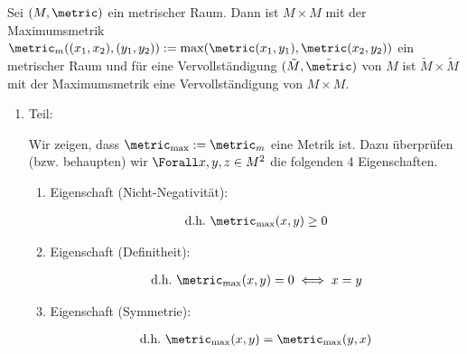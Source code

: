 
\begin{exercise}

Sei $(M, \metric)$ ein metrischer Raum.
Dann ist $M \times M$ mit der Maximumsmetrik $\metric_m((x_1, x_2), (y_1, y_2)) := \max(\metric(x_1, y_1), \metric(x_2, y_2))$ ein metrischer Raum und für eine Vervollständigung $(\tilde M, \tilde \metric)$ von $M$ ist $\tilde M \times \tilde M$ mit der Maximumsmetrik eine Vervollständigung von $M \times M$.

\end{exercise}


\begin{solution}

\phantom{}

\begin{enumerate}[label = \arabic*.]

    \item Teil:
    
    Wir zeigen, dass $\metric_{\max} := \metric_m$ eine Metrik ist.
    Dazu überprüfen (bzw. behaupten) wir $\Forall x, y, z \in M^2$ die folgenden 4 Eigenschaften.
    
    \begin{enumerate}[label = \arabic*.]

        \item Eigenschaft (Nicht-Negativität):
        
        \begin{align*}
            \text{d.h.}~
            \metric_{\max}(x, y) \geq 0
        \end{align*}

        \item Eigenschaft (Definitheit):
        
        \begin{align*}
            \text{d.h.}~
            \metric_{\max}(x, y) = 0 \iff x = y
        \end{align*}

        \item Eigenschaft (Symmetrie):
        
        \begin{align*}
            \text{d.h.}~
            \metric_{\max}(x, y) = \metric_{\max}(y, x)
        \end{align*}


\end{enumerate}
\end{enumerate}
\end{solution}
